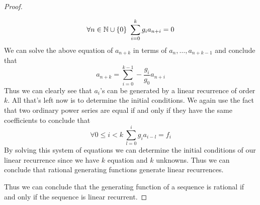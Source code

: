 \begin{proof}
\begin{itemize}
                    \[
                        \forall n \in \union{\set{N}}{\Set{0}} \ \sum_{i = 0}^{k} g_i a_{n + i} = 0
                    \]
                    We can solve the above equation of $a_{n + k}$ in terms of $a_n, \dots, a_{n + k - 1}$ and conclude that
                    \begin{equation}
                            a_{n + k} = \sum_{i = 0}^{k - 1} -\frac{g_i}{g_0} a_{n + i}
                        \label{recurrence equation}
                    \end{equation}
                    Thus we can clearly see that $a_i$'s can be generated by a linear recurrence of order $k$. All that's left now is to determine
                    the initial conditions. We again use the fact that two ordinary power series are equal if and only if they
                    have the same coefficients to conclude that
                    \begin{equation}
                        \forall 0 \le i < k \ \sum_{l = 0}^{i} g_i a_{i - l} = f_i
                        \label{initial conditions equations}
                    \end{equation}
                    By solving this system of equations we can determine the initial conditions of our linear recurrence since
                    we have $k$ equation and $k$ unknowns. Thus we can conclude that rational generating functions generate
                    linear recurrences.
            \end{itemize}
            Thus we can conclude that the generating function of a sequence is
            rational if and only if the sequence is linear recurrent. \QED
        \end{proof}

